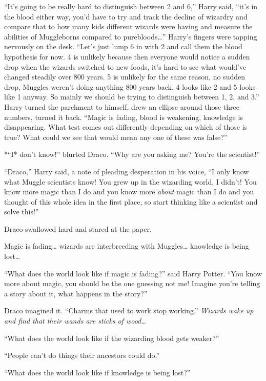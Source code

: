 ``It's going to be really hard to distinguish between 2 and 6,'' Harry
said, ``it's in the blood either way, you'd have to try and track the
decline of wizardry and compare that to how many kids different wizards
were having and measure the abilities of Muggleborns compared to
purebloods\ldots{}'' Harry's fingers were tapping nervously on the desk.
``Let's just lump 6 in with 2 and call them the blood hypothesis for
now. 4 is unlikely because then everyone would notice a sudden drop when
the wizards switched to new foods, it's hard to see what would've
changed steadily over 800 years. 5 is unlikely for the same reason, no
sudden drop, Muggles weren't doing anything 800 years back. 4 looks like
2 and 5 looks like 1 anyway. So mainly we should be trying to
distinguish between 1, 2, and 3.'' Harry turned the parchment to
himself, drew an ellipse around those three numbers, turned it back.
``Magic is fading, blood is weakening, knowledge is disappearing. What
test comes out differently depending on which of those is true? What
could we see that would mean any one of these was false?''

*``I* don't know!'' blurted Draco. ``Why are you asking me? You're the
scientist!''

``Draco,'' Harry said, a note of pleading desperation in his voice, ``I
only know what Muggle scientists know! You grew up in the wizarding
world, I didn't! You know more magic than I do and you know more
\emph{about} magic than I do and you thought of this whole idea in the
first place, so start thinking like a scientist and solve this!''

Draco swallowed hard and stared at the paper.

Magic is fading\ldots{} wizards are interbreeding with Muggles\ldots{}
knowledge is being lost\ldots{}

``What does the world look like if magic is fading?'' said Harry Potter.
``You know more about magic, you should be the one guessing not me!
Imagine you're telling a story about it, what happens in the story?''

Draco imagined it. ``Charms that used to work stop working.''
\emph{Wizards wake up and find that their wands are sticks of
wood\ldots{}}

``What does the world look like if the wizarding blood gets weaker?''

``People can't do things their ancestors could do.''

``What does the world look like if knowledge is being lost?''

